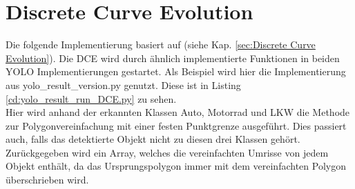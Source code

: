 \section{Discrete Curve Evolution}{
	\label{py:DCE}
	Die folgende Implementierung basiert auf \citeauthor{Barkowsky2000} \citep{Barkowsky2000} (siehe Kap. \ref{sec:Discrete Curve Evolution}). Die DCE wird durch ähnlich implementierte Funktionen in beiden YOLO Implementierungen gestartet. Als Beispiel wird hier die Implementierung aus yolo\_result\_version.py genutzt. Diese ist in Listing \ref{cd:yolo_result_run_DCE.py} zu sehen. \\
	Hier wird anhand der erkannten Klassen Auto, Motorrad und LKW die Methode zur Polygonvereinfachung mit einer festen Punktgrenze ausgeführt. Dies passiert auch, falls das detektierte Objekt nicht zu diesen drei Klassen gehört. \\ 
	
	Zurückgegeben wird ein Array, welches die vereinfachten Umrisse von jedem Objekt enthält, da das Ursprungspolygon immer mit dem vereinfachten Polygon überschrieben wird. \\

	

}
